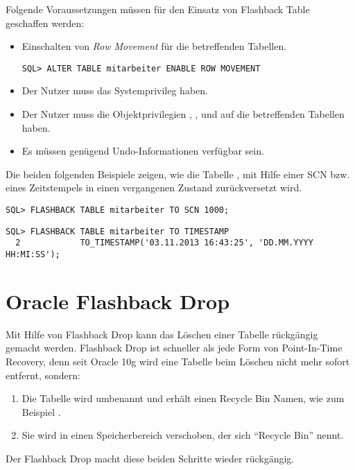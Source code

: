       Folgende Voraussetzungen m\"ussen f\"ur den Einsatz von Flashback Table geschaffen werden:
\clearpage
      \begin{itemize}
        \item Einschalten von \textit{Row Movement} f\"ur die betreffenden Tabellen.
        \begin{lstlisting}[caption={Einschalten von Row Movement},label=admin1714,language=oracle_sql]
SQL> ALTER TABLE mitarbeiter ENABLE ROW MOVEMENT
        \end{lstlisting}
        \item Der Nutzer muss das Systemprivileg  haben.
        \item Der Nutzer muss die Objektprivilegien , ,  und  auf die betreffenden Tabellen haben.
        \item Es m\"ussen gen\"ugend Undo-Informationen verf\"ugbar sein.
      \end{itemize}
      Die beiden folgenden Beispiele zeigen, wie die Tabelle , mit Hilfe einer SCN bzw. eines Zeitstempels in einen vergangenen Zustand zur\"uckversetzt wird.
      \begin{lstlisting}[caption={Flashback Table mit SCN},label=admin1715,language=oracle_sql]
SQL> FLASHBACK TABLE mitarbeiter TO SCN 1000;
      \end{lstlisting}
      \begin{lstlisting}[caption={Flashback Table mit Zeitstempel},label=admin1716,language=oracle_sql]
SQL> FLASHBACK TABLE mitarbeiter TO TIMESTAMP
  2            TO_TIMESTAMP('03.11.2013 16:43:25', 'DD.MM.YYYY HH:MI:SS');
      \end{lstlisting}
    \section{Oracle Flashback Drop}
      Mit Hilfe von Flashback Drop kann das L\"oschen einer Tabelle r\"uckg\"angig gemacht werden. Flashback Drop ist schneller als jede Form von Point-In-Time Recovery, denn seit Oracle 10g wird eine Tabelle beim L\"oschen nicht mehr sofort entfernt, sondern:
      \begin{enumerate}
        \item Die Tabelle wird umbenannt und erh\"alt einen Recycle Bin Namen, wie zum Beispiel  .
        \item Sie wird in einen Speicherbereich verschoben, der sich \enquote{Recycle Bin} nennt.
      \end{enumerate}
      Der Flashback Drop macht diese beiden Schritte wieder r\"uckg\"angig.
